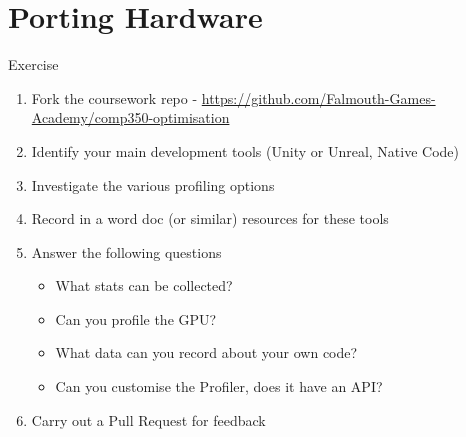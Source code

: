\part{Porting Hardware}
\frame{\partpage}

\begin{frame}{Exercise}
	\begin{enumerate}
		\item Fork the coursework repo - \url{https://github.com/Falmouth-Games-Academy/comp350-optimisation}
		\item Identify your main development tools (Unity or Unreal, Native Code)
		\item Investigate the various profiling options
		\item Record in a word doc (or similar) resources for these tools
		\item Answer the following questions
		\begin{itemize}
			\item What stats can be collected?
			\item Can you profile the GPU?
			\item What data can you record about your own code?
			\item Can you customise the Profiler, does it have an API?
		\end{itemize}
		\item Carry out a Pull Request for feedback 
	\end{enumerate}
\end{frame}